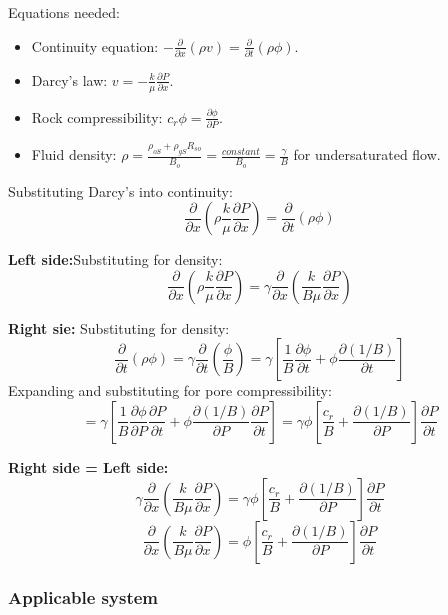 Equations needed:
\begin{itemize}
  \item Continuity equation: $-\frac{\partial }{\partial x} (\rho v) = \frac{\partial }{\partial t} (\rho \phi)$.
  \item Darcy's law: $v = - \frac{k}{\mu} \frac{\partial P}{\partial x}$.
  \item Rock compressibility: $c_r \phi = \frac{\partial \phi}{\partial P}$.
  \item Fluid density: $\rho = \frac{\rho_{oS} + \rho_{gS}R_{so}}{B_o} = \frac{constant}{B_o} = \frac{\gamma}{B}$ for undersaturated flow.
\end{itemize}

Substituting Darcy's into continuity:
\[
  \frac{\partial }{\partial x} \left(\rho \frac{k}{\mu} \frac{\partial P}{\partial x} \right)
  = \frac{\partial }{\partial t} (\rho \phi)
\]

\textbf{Left side:}Substituting for density:
\[
  \frac{\partial }{\partial x} \left(\rho \frac{k}{\mu} \frac{\partial P}{\partial x} \right)
  =\gamma\frac{\partial}{\partial x}\left(\frac{k}{B\mu}\frac{\partial P}{\partial x}\right)
\]

\textbf{Right sie:} Substituting for density:
\[
  \frac{\partial }{\partial t} (\rho \phi)
  = \gamma\frac{\partial}{\partial t}\left(\frac{\phi}{B}\right)
  =\gamma\left[\frac{1}{B}\frac{\partial\phi}{\partial t}+\phi\frac{\partial(1/B)}{\partial t}\right]
\]
Expanding and substituting for pore compressibility:
\[
  =\gamma\left[\frac{1}{B}\frac{\partial\phi}{\partial P}\frac{\partial P}{\partial t}+\phi\frac{\partial(1/B)}{\partial P} \frac{\partial P}{\partial t} \right]
  =\gamma\phi\left[\frac{c_r}{B}+\frac{\partial(1/B)}{\partial P}\right] \frac{\partial P}{\partial t}
\]

\textbf{Right side = Left side:}
\[
 \gamma\frac{\partial}{\partial x}\left(\frac{k}{B\mu}\frac{\partial P}{\partial x}\right)
 = \gamma\phi\left[\frac{c_r}{B}+\frac{\partial(1/B)}{\partial P}\right] \frac{\partial P}{\partial t}
\]
\begin{equation}
  \frac{\partial}{\partial x}\left(\frac{k}{B\mu}\frac{\partial P}{\partial x}\right)
 = \phi\left[\frac{c_r}{B}+\frac{\partial(1/B)}{\partial P}\right] \frac{\partial P}{\partial t}
\end{equation}



\subsubsection{Applicable system} %
\label{ssub:applicable_system}

